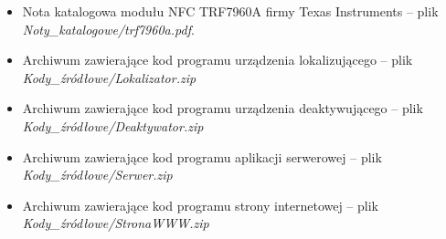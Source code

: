 \begin{itemize}
  \item Nota katalogowa modułu NFC TRF7960A firmy Texas Instruments -- plik\\ \textit{Noty\_katalogowe/trf7960a.pdf}.
  
  \item Archiwum zawierające kod programu urządzenia lokalizującego -- plik\\ \textit{Kody\_źródłowe/Lokalizator.zip}
  
  \item Archiwum zawierające kod programu urządzenia deaktywującego -- plik\\ \textit{Kody\_źródłowe/Deaktywator.zip}

  \item Archiwum zawierające kod programu aplikacji serwerowej -- plik\\ \textit{Kody\_źródłowe/Serwer.zip}
  
  \item Archiwum zawierające kod programu strony internetowej -- plik\\ \textit{Kody\_źródłowe/StronaWWW.zip}

\end{itemize}


